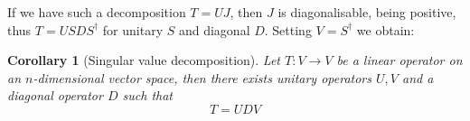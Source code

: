 \documentclass[12pt]{article}
\theoremstyle{plain}
\newtheorem{cor}[thm]{Corollary}
\theoremstyle{definition}
\newcommand{\lto}{\longrightarrow}
\begin{document}
If we have such a decomposition $T = UJ$, then $J$ is diagonalisable, being positive, thus $T = USDS^\dagger$ for unitary $S$ and diagonal $D$. Setting $V = S^\dagger$ we obtain:
\begin{cor}[Singular value decomposition]
Let $T: V \lto V$ be a linear operator on an $n$-dimensional vector space, then there exists unitary operators $U,V$ and a diagonal operator $D$ such that
\begin{equation}
T = UDV
\end{equation}
\end{cor}
\end{document}
